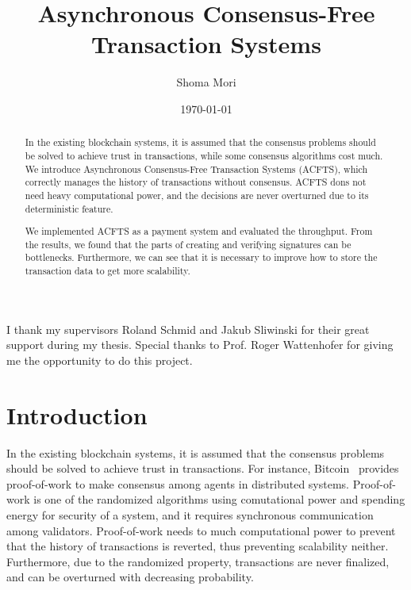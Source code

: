 \documentclass[a4paper, oneside]{discothesis}
\title{Asynchronous Consensus-Free Transaction Systems}
\author{Shoma Mori}
\institute{Distributed Computing Group \\[2pt]
Computer Engineering and Networks Laboratory \\[2pt]
ETH Zürich}
\date{\today}
\begin{document}
\frontmatter %
\maketitle

\cleardoublepage

\begin{acknowledgements}
    I thank my supervisors Roland Schmid and Jakub Sliwinski for their great support
    during my thesis.
    Special thanks to Prof. Roger Wattenhofer for giving me the opportunity to do this project.
\end{acknowledgements}


\begin{abstract}
In the existing blockchain systems, it is assumed that the consensus problems
should be solved to achieve trust in transactions, while some consensus algorithms cost much.
We introduce Asynchronous Consensus-Free Transaction Systems (ACFTS),
which correctly manages the history of transactions without consensus.
ACFTS dons not need heavy computational power, and the decisions are never overturned
due to its deterministic feature.

We implemented ACFTS as a payment system and evaluated the throughput.
From the results, we found that the parts of creating and verifying signatures
can be bottlenecks.
Furthermore, we can see that it is necessary to improve how to store the transaction data
to get more scalability.
\end{abstract}

\tableofcontents

\mainmatter %

\chapter{Introduction}

In the existing blockchain systems, it is assumed that the consensus problems
should be solved to achieve trust in transactions.
For instance, Bitcoin~\cite{bitcoin} provides proof-of-work to make consensus
among agents in distributed systems.
Proof-of-work is one of the randomized algorithms using comutational power
and spending energy for security of a system, and it requires synchronous communication
among validators.
Proof-of-work needs to much computational power to prevent that the history of transactions
is reverted, thus preventing scalability neither.
Furthermore, due to the randomized property, transactions are never finalized,
and can be overturned with decreasing probability.
\end{document}

